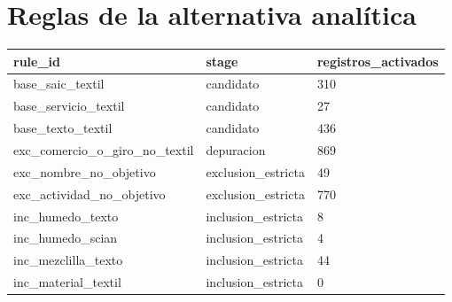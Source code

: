 \documentclass[11pt]{article}
\begin{document}
\section{Reglas de la alternativa analítica}

\begin{tabular}{lll}
\toprule
rule\_id & stage & registros\_activados \\
\midrule
base\_saic\_textil & candidato & 310 \\
base\_servicio\_textil & candidato & 27 \\
base\_texto\_textil & candidato & 436 \\
exc\_comercio\_o\_giro\_no\_textil & depuracion & 869 \\
exc\_nombre\_no\_objetivo & exclusion\_estricta & 49 \\
exc\_actividad\_no\_objetivo & exclusion\_estricta & 770 \\
inc\_humedo\_texto & inclusion\_estricta & 8 \\
inc\_humedo\_scian & inclusion\_estricta & 4 \\
inc\_mezclilla\_texto & inclusion\_estricta & 44 \\
inc\_material\_textil & inclusion\_estricta & 0 \\
\bottomrule
\end{tabular}
\end{document}
